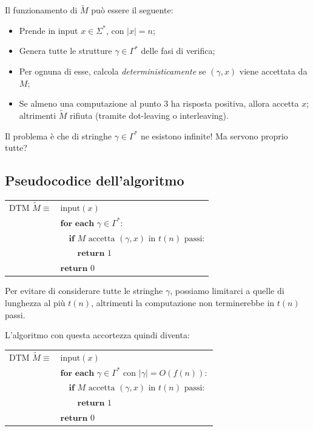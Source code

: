 Il funzionamento di $\widetilde{M}$ può essere il seguente:
\begin{itemize}
    \item Prende in input $x \in \Sigma^*$, con $|x| = n$;
    
    \item Genera tutte le strutture $\gamma \in \Gamma^*$ delle fasi di verifica;
    
    \item Per ognuna di esse, calcola \emph{deterministicamente} se $(\gamma, x)$ viene accettata da $M$;
    
    \item Se almeno una computazione al punto 3 ha risposta positiva, allora accetta $x$; altrimenti $\widetilde{M}$ rifiuta (tramite dot-leaving o interleaving).
\end{itemize}

Il problema è che di stringhe $\gamma \in \Gamma^*$ ne esistono infinite! Ma servono proprio tutte?

\subsection{Pseudocodice dell'algoritmo}

\begin{center}
	\begin{tabular}{r|l|}
		\cline{2-2}
		$\text{DTM } \widetilde{M} \equiv$	& $\text{input}(x)$ \\
			& $ \textbf{for each } \gamma \in \Gamma^*:$ \\
											& $\quad \textbf{if } M \text{ accetta } (\gamma, x) \text{ in } t(n) \text{ passi:}$ \\
	  		& $  \quad \quad \textbf{return } 1$ \\
			& $\textbf{return } 0$ \\
		\cline{2-2}
	\end{tabular}
\end{center}

Per evitare di considerare tutte le stringhe $\gamma$, possiamo limitarci a quelle di lunghezza al più $t(n)$, altrimenti la computazione non terminerebbe in $t(n)$ passi.

L’algoritmo con questa accortezza quindi diventa:

\begin{center}
	\begin{tabular}{r|l|}
		\cline{2-2}
		$\text{DTM } \widetilde{M} \equiv$	& $\text{input}(x)$ \\
			& $ \textbf{for each } \gamma \in \Gamma^* \text{ con } |\gamma| = O(f(n)):$ \\
											& $\quad \textbf{if } M \text{ accetta } (\gamma, x) \text{ in } t(n) \text{ passi:}$ \\
	  		& $  \quad \quad \textbf{return } 1$ \\
			& $\textbf{return } 0$ \\
		\cline{2-2}
	\end{tabular}
\end{center}

